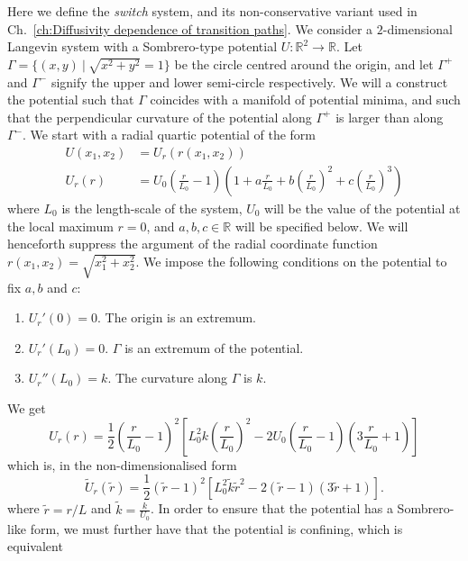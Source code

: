\documentclass[withindex,glossary,techreport]{cam-thesis}
\begin{document}
Here we define the \textit{switch} system, and its non-conservative variant used in Ch.~\ref{ch:Diffusivity dependence of transition paths}. We consider a $2$-dimensional Langevin system with a Sombrero-type potential $U : \mathbb{R}^2 \to \mathbb{R}$. Let $\Gamma=\{(x,y)\ |\ \sqrt{x^2 + y^2} =1\}$ be the circle centred around the origin, and let $\Gamma^{+}$ and
$\Gamma^{-}$ signify the upper and lower semi-circle respectively. We will a construct the potential such that $\Gamma$ coincides with a manifold of potential minima, and such that the perpendicular curvature of the potential along $\Gamma^{+}$ is larger than along $\Gamma^{-}$. We
start with a radial quartic potential of the form 
\begin{align}
U(x_{1},x_{2}) & =U_{r}(r(x_{1},x_{2}))\\
U_{r}(r) & =U_{0}\left(\frac{r}{L_0}-1\right)\left(1+a\frac{r}{L_0}+b\left(\frac{r}{L_0}\right)^{2}+c\left(\frac{r}{L_0}\right)^{3}\right)\nonumber 
\end{align}
where $L_0$ is the length-scale of the system, $U_{0}$ will be the
value of the potential at the local maximum $r=0$, and $a,b,c\in\mathbb{R}$
will be specified below. We will henceforth suppress the argument of
the radial coordinate function $r(x_{1},x_{2})=\sqrt{x_{1}^{2}+x_{2}^{2}}$. We
impose the following conditions on the potential to fix $a, b$ and $c$:
\begin{enumerate}
\item $U_r'(0) = 0$. The origin is an extremum.
\item $U_r'(L_0) = 0$. $\Gamma$ is an extremum of the potential.
\item $U_r''(L_0) = k$. The curvature along $\Gamma$ is $k$.
\end{enumerate}
We get
\begin{equation}
U_{r}(r)=\frac{1}{2}\left(\frac{r}{L_0}-1\right)^{2}\left[L_0^{2} k \left(\frac{r}{L_0}\right)^{2}-2U_{0}\left(\frac{r}{L_0}-1\right)\left(3\frac{r}{L_0}+1\right)\right]
\end{equation}
which is, in the non-dimensionalised form
\begin{equation}
\tilde{U}_{r}(\tilde{r})= \frac{1}{2} 
\left( \tilde{r} -1 \right)^{2} \left[L_0^{2} \tilde{k} \tilde{r}^{2}-2  
\left(\tilde{r}-1\right)\left(3\tilde{r}+1\right)\right].
\end{equation}
where $\tilde{r} = r / L$ and $\tilde{k} = \frac{k}{U_0}$. In order to ensure that the potential has a Sombrero-like form, we
must further have that the potential is confining, which is equivalent
\end{document}
